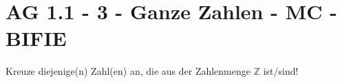 \section{AG 1.1 - 3 - Ganze Zahlen - MC - BIFIE}

\begin{beispiel}[AG 1.1]{1} %
Kreuze diejenige(n) Zahl(en) an, die aus der Zahlenmenge $\mathbb{Z}$ ist/sind!
\end{beispiel}
